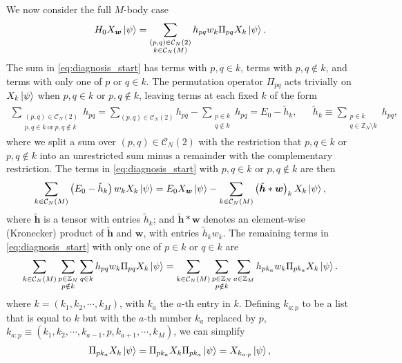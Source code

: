 \documentclass[nofootinbib,notitlepage,11pt]{revtex4-2}
\renewcommand{\t}{\text} %
\newcommand{\p}[1]{\left(#1\right)} %
\newcommand{\m}{\bm} %
\newcommand{\1}{\mathds{1}}
\newcommand{\C}{\mathcal{C}}
\newcommand{\ZZ}{\mathbb{Z}}
\begin{document}
We now consider the full $M$-body case
\begin{align}
  H_0 X_{\m w} \ket\psi
  = \sum_{\substack{\p{p,q}\in\C_N\p{2}\\k\in\C_N\p{M}}}
  h_{pq} w_k \Pi_{pq} X_k \ket\psi.
  \label{eq:diagnosis_start}
\end{align}
The sum in \eqref{eq:diagnosis_start} has terms with $p,q\in k$, terms
with $p,q\notin k$, and terms with only one of $p$ or $q\in k$.  The
permutation operator $\Pi_{pq}$ acts trivially on $X_k\ket\psi$ when
$p,q\in k$ or $p,q\notin k$, leaving terms at each fixed $k$ of the
form
\begin{align}
  \sum_{\substack{\p{p,q}\in\C_N\p{2}\\p,q\in k~\t{or}~p,q\notin k}} h_{pq}
  = \sum_{\p{p,q}\in\C_N\p{2}} h_{pq}
  - \sum_{\substack{p\in k\\q\notin k}} h_{pq}
  = E_0 - \tilde h_k,
  &&
  \tilde h_k \equiv \sum_{\substack{p\in k\\q\in\ZZ_N\setminus k}} h_{pq},
\end{align}
where we split a sum over $\p{p,q}\in\C_N\p{2}$ with the restriction
that $p,q\in k$ or $p,q\notin k$ into an unrestricted sum minus a
remainder with the complementary restriction.  The terms in
\eqref{eq:diagnosis_start} with $p,q\in k$ or $p,q\notin k$ are then
\begin{align}
  \sum_{k\in\C_N\p{M}} \p{E_0 - \tilde h_k} w_k X_k \ket\psi
  = E_0 X_{\m w} \ket\psi
  - \sum_{k\in\C_N\p{M}} \p{\tilde{\m h} * \m w}_k X_k \ket\psi,
\end{align}
where $\tilde{\m h}$ is a tensor with entries $\tilde h_k$; and
$\tilde{\m h} * \m w$ denotes an element-wise (Kronecker) product of
$\tilde{\m h}$ and $\m w$, with entries $\tilde h_k w_k$.  The
remaining terms in \eqref{eq:diagnosis_start} with only one of
$p\in k$ or $q\in k$ are
\begin{align}
  \sum_{k\in\C_N\p{M}} \sum_{\substack{p\in\ZZ_N\\p\notin k}} \sum_{q\in k}
  h_{pq} w_k \Pi_{pq} X_k \ket\psi
  = \sum_{k\in\C_N\p{M}} \sum_{\substack{p\in\ZZ_N\\p\notin k}}
  \sum_{a\in\ZZ_M} h_{p k_a} w_k \Pi_{p k_a} X_k \ket\psi.
\end{align}
where $k=\p{k_1,k_2,\cdots,k_M}$, with $k_a$ the $a$-th entry in $k$.
Defining $k_{a:p}$ to be a list that is equal to $k$ but with the
$a$-th number $k_a$ replaced by $p$,
$k_{a:p}\equiv\p{k_1,k_2,\cdots,k_{a-1},p,k_{a+1},\cdots,k_M}$, we can
simplify
\begin{align}
  \Pi_{p k_a} X_k \ket\psi
  = \Pi_{p k_a} X_k \Pi_{p k_a} \ket\psi
  = X_{k_{a:p}}\ket\psi,
\end{align}
\end{document}
